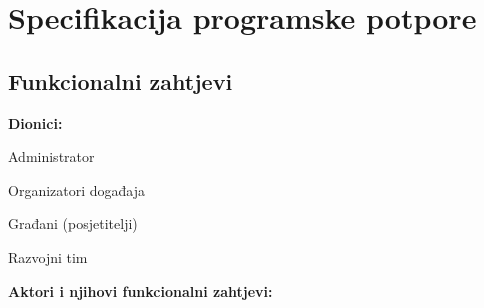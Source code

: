 \chapter{Specifikacija programske potpore}
		
	\section{Funkcionalni zahtjevi}
					
			\noindent \textbf{Dionici:}
			
			\begin{packed_enum}
				
				\item Administrator
				\item Organizatori događaja
				\item Građani (posjetitelji)
				\item Razvojni tim				
				
			\end{packed_enum}
			
			\noindent \textbf{Aktori i njihovi funkcionalni zahtjevi:}
			
